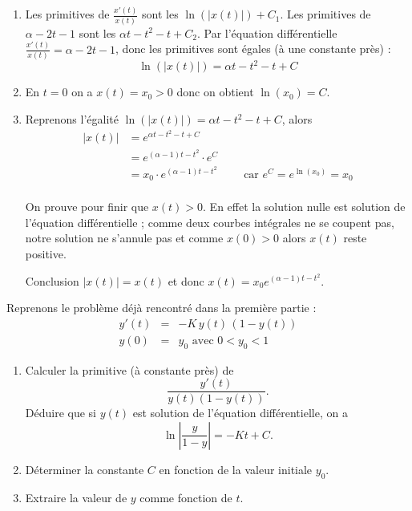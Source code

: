 \documentclass[11pt,class=report,crop=false]{standalone}
\begin{document}
\sauteligne
\begin{enumerate}
  \item 
Les primitives de $\frac{x'(t)}{x(t)}$ sont les $\ln ( |x(t)| ) + C_1$.
Les primitives de $\alpha-2t-1$ sont les $\alpha t-t^2-t+C_2$.
Par l'équation différentielle $\frac{x'(t)}{x(t)} = \alpha - 2t -1$, donc les primitives sont égales (à une constante près) :
$$\ln ( |x(t)| ) = \alpha t-t^2-t+C$$


  \item En $t=0$ on a $x(t)=x_0>0$ donc on obtient $\ln (x_0) = C$.

  \item Reprenons l'égalité $\ln ( |x(t)| ) = \alpha t-t^2-t+C$,
alors
\begin{align*}
|x(t)| 
  &= e^{\alpha t-t^2-t+C} \\
  &= e^{(\alpha-1) t-t^2} \cdot e^{C} \\
  &= x_0 \cdot e^{(\alpha-1) t-t^2} \qquad \text{ car } e^C = e^{\ln (x_0)} = x_0 \\
\end{align*}

On prouve pour finir que $x(t)>0$. En effet la solution nulle est solution de l'équation différentielle ; comme deux courbes intégrales ne se coupent pas, notre solution ne s'annule pas et comme $x(0)>0$ alors $x(t)$ reste positive.

Conclusion $|x(t)| = x(t)$ et donc $x(t) = x_0 e^{(\alpha-1) t-t^2}$.

\end{enumerate}
\fincorrection
\finexercice

\exercice{}
\enonce
Reprenons le problème déjà rencontré dans la première partie :
\begin{eqnarray}
y'(t) & = & - K \, y(t) \, (1-y(t)) \label{cix1} \\
y(0)  & = & y_0  \text{ avec } 0 < y_0 < 1 \label{cix2}
\end{eqnarray}

\begin{enumerate}
	\item Calculer la primitive (à constante près) de $$\frac{y'(t)}{y(t)(1-y(t))}.$$ 
	Déduire que si $y(t)$ est solution  de l'équation différentielle,
	on a $$\ln \left|\frac{y}{1-y}\right| = -Kt + C.$$
	\item Déterminer la constante $C$ en fonction de la valeur initiale $y_0$.
	\item Extraire la valeur de $y$ comme fonction de $t$.
\end{enumerate}  
\finenonce
\end{document}
